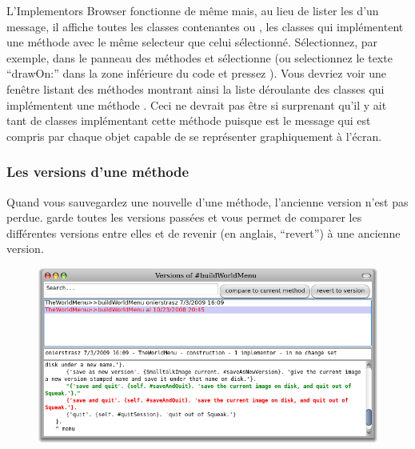 \documentclass[a4paper,10pt,twoside]{book}
\begin{document}
L'Implementors Browser fonctionne de même mais, au lieu de
lister les \senders d'un message, il affiche toutes les classes
contenantes ou \implementors, \ie les classes qui implémentent une
méthode avec le même selecteur
que celui sélectionné.
Sélectionnez, par exemple,  dans le panneau des méthodes
et sélectionne  (ou selectionnez le
texte ``drawOn:'' dans la zone inférieure du code et pressez 
).
Vous devriez voir une fenêtre listant des méthodes montrant ainsi la
liste déroulante des \arevoir{\drawOnImplNumber} %
classes qui implémentent une méthode .
Ceci ne devrait pas être si surprenant qu'il y ait tant de classes
implémentant cette méthode puisque  est le message qui est
compris par chaque objet capable de se représenter graphiquement à
l'écran.

\subsubsection{Les versions d'une méthode}

Quand vous sauvegardez une nouvelle  d'une méthode,
l'ancienne version n'est pas perdue. \pharo garde toutes les versions passées et vous permet 
de comparer les différentes versions entre elles et de revenir (en anglais, ``revert'') à une ancienne version.
\begin{figure}[btp]
   \centering
	   {\includegraphics[width=\textwidth]{Versions} }
   \caption{}
\end{figure} %
\end{document}
